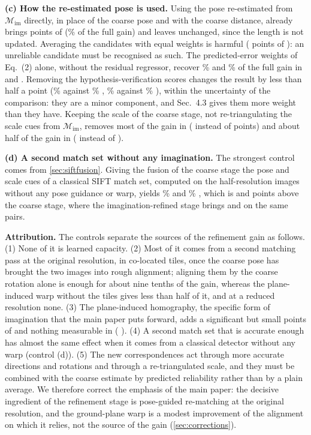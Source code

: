 \noindent\textbf{(c) How the re-estimated pose is used.} Using the pose re-estimated from $\mathcal{M}_{\mathrm{im}}$ directly, in place of the coarse pose and with the coarse distance, already brings \ctDirectdSRe{} points of \SRe{} (\ctDirectShareE\% of the full gain) and leaves \SRd{} unchanged, since the length is not updated. Averaging the candidates with equal weights is harmful (\ctUniformdSRd{} points of \SRd): an unreliable candidate must be recognised as such. The predicted-error weights of Eq.~(2) alone, without the residual regressor, recover \ctLearnedNoResShareD\% and \ctLearnedNoResShareE\% of the full gain in \SRd{} and \SRe. Removing the hypothesis-verification scores changes the result by less than half a point (\ctNoVerSRd\% against \ctFullSRd\% \SRd, \ctNoVerSRe\% against \ctFullSRe\% \SRe), within the uncertainty of the comparison: they are a minor component, and Sec.~4.3 gives them more weight than they have. Keeping the scale of the coarse stage, \ie not re-triangulating the scale cues from $\mathcal{M}_{\mathrm{im}}$, removes most of the gain in \SRd{} (\ctNoScaledSRd{} instead of \ctFulldSRd{} points) and about half of the gain in \SRe{} (\ctNoScaledSRe{} instead of \ctFulldSRe).

\noindent\textbf{(d) A second match set without any imagination.} The strongest control comes from \cref{sec:siftfusion}. Giving the fusion of the coarse stage the pose and scale cues of a classical SIFT match set, computed on the half-resolution images without any pose guidance or warp, yields \sfuCoarseSiftSRd\% \SRd{} and \sfuCoarseSiftSRe\% \SRe, which is \sfuAddCoarseSRd{} and \sfuAddCoarseSRe{} points above the coarse stage, where the imagination-refined stage brings \ctFulldSRd{} and \ctFulldSRe{} on the same pairs.

\noindent\textbf{Attribution.} The controls separate the sources of the refinement gain as follows. (1) None of it is learned capacity. (2) Most of it comes from a second matching pass at the original resolution, in co-located tiles, once the coarse pose has brought the two images into rough alignment; aligning them by the coarse rotation alone is enough for about nine tenths of the gain, whereas the plane-induced warp without the tiles gives less than half of it, and at a reduced resolution none. (3) The plane-induced homography, the specific form of imagination that the main paper puts forward, adds a significant but small \ctPlaneGainSRe{} points of \SRe{} \ci{\ctPlaneGainSReLo}{\ctPlaneGainSReHi} and nothing measurable in \SRd{} (\ctPlaneGainSRd{} \ci{\ctPlaneGainSRdLo}{\ctPlaneGainSRdHi}). (4) A second match set that is accurate enough has almost the same effect when it comes from a classical detector without any warp (control (d)). (5) The new correspondences act through more accurate directions and rotations and through a re-triangulated scale, and they must be combined with the coarse estimate by predicted reliability rather than by a plain average. We therefore correct the emphasis of the main paper: the decisive ingredient of the refinement stage is pose-guided re-matching at the original resolution, and the ground-plane warp is a modest improvement of the alignment on which it relies, not the source of the gain (\cref{sec:corrections}).

